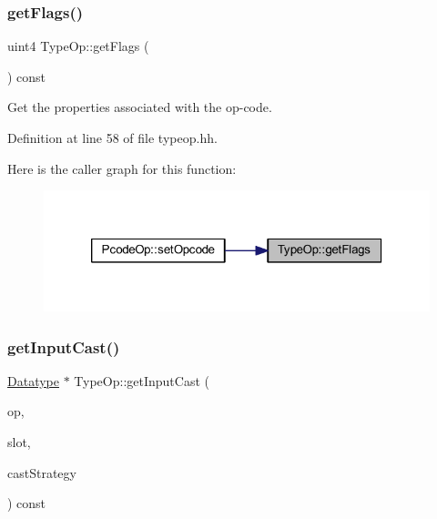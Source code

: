\subsubsection{\texorpdfstring{getFlags()}{getFlags()}}
{\footnotesize\ttfamily uint4 Type\+Op\+::get\+Flags (\begin{DoxyParamCaption}\item[{void}]{ }\end{DoxyParamCaption}) const\hspace{0.3cm}{\ttfamily [inline]}}



Get the properties associated with the op-\/code. 



Definition at line 58 of file typeop.\+hh.

Here is the caller graph for this function\+:
\nopagebreak
\begin{figure}[H]
\begin{center}
\leavevmode
\includegraphics[width=320pt]{class_type_op_acef6af9a0ebdbfb22f258f634f810525_icgraph}
\end{center}
\end{figure}
\mbox{\label{class_type_op_a950c417e4af100d176a701af5816b5ab}} 
\subsubsection{\texorpdfstring{getInputCast()}{getInputCast()}}
{\footnotesize\ttfamily \mbox{\hyperlink{class_datatype}{Datatype}} $\ast$ Type\+Op\+::get\+Input\+Cast (\begin{DoxyParamCaption}\item[{const \mbox{\hyperlink{class_pcode_op}{Pcode\+Op}} $\ast$}]{op,  }\item[{int4}]{slot,  }\item[{const \mbox{\hyperlink{class_cast_strategy}{Cast\+Strategy}} $\ast$}]{cast\+Strategy }\end{DoxyParamCaption}) const\hspace{0.3cm}{\ttfamily [virtual]}}



